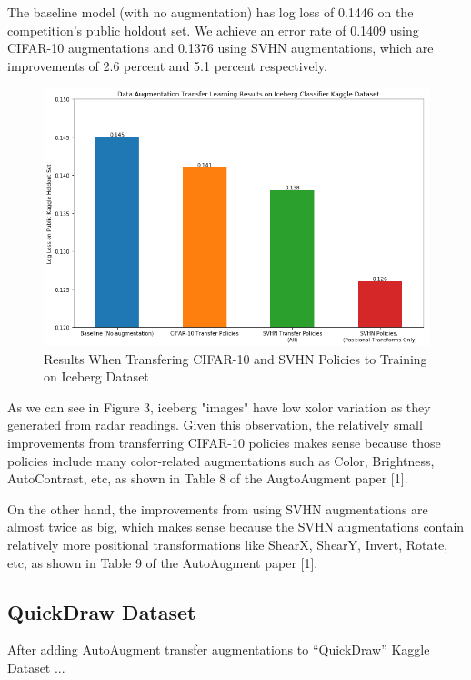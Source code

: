 \documentclass[10pt,twocolumn,letterpaper]{article}
\begin{document}
The baseline model (with no augmentation) has log loss of 0.1446 on the competition's public holdout set. We achieve an error rate of 0.1409 using CIFAR-10 augmentations and 0.1376 using SVHN augmentations, which are improvements of 2.6 percent and 5.1 percent respectively.

\begin{figure}[bhp]
\includegraphics[width=\columnwidth]{iceberg_results.png}
\caption{Results When Transfering CIFAR-10 and SVHN Policies to Training on Iceberg Dataset}
\end{figure}

As we can see in Figure 3, iceberg "images" have low xolor variation as they generated from radar readings. Given this observation, the relatively small improvements from transferring CIFAR-10 policies makes sense because those policies include many color-related augmentations such as Color, Brightness, AutoContrast, etc, as shown in Table 8 of the AugtoAugment paper [1].  

On the other hand, the improvements from using SVHN augmentations are almost twice as big, which makes sense because the SVHN augmentations contain relatively more positional transformations like ShearX, ShearY, Invert, Rotate, etc, as shown in Table 9 of the AutoAugment paper [1].  



\subsection{QuickDraw Dataset}

After adding AutoAugment transfer augmentations to “QuickDraw” Kaggle Dataset ...
\end{document}
